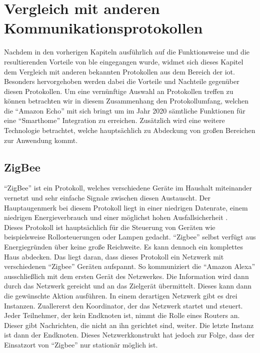 \section{Vergleich mit anderen Kommunikationsprotokollen}
\label{s:vergleich}

Nachdem in den vorherigen Kapiteln ausführlich auf die Funktionsweise und die resultierenden Vorteile von \ac{ble} eingegangen wurde, widmet sich dieses Kapitel dem Vergleich mit anderen bekannten Protokollen aus dem Bereich der \ac{iot}. Besonders hervorgehoben werden dabei die Vorteile und Nachteile gegenüber diesen Protokollen. Um eine vernünftige Auswahl an Protokollen treffen zu können betrachten wir in diesem Zusammenhang den Protokollumfang, welchen die "`Amazon Echo"' mit sich bringt um im Jahr 2020 sämtliche Funktionen für eine "`Smarthome"' Integration zu erreichen. Zusätzlich wird eine weitere Technologie betrachtet, welche hauptsächlich zu Abdeckung von großen Bereichen zur Anwendung kommt.\\  

\subsection{ZigBee}
\label{ss:vergleich:zigbee}

"`ZigBee"' ist ein Protokoll, welches verschiedene Geräte im Haushalt miteinander vernetzt und sehr einfache Signale zwischen diesen Austauscht. Der Hauptaugenmerk bei diesem Protokoll liegt in einer niedrigen Datenrate, einem niedrigen Energieverbrauch und einer möglichst hohen Ausfallsicherheit \cite[Seite 195]{Gessler14:WNN}.\\ 

\noindent Dieses Protokoll ist hauptsächlich für die Steuerung von Geräten wie beispielsweise Rollosteuerungen oder Lampen gedacht. "`Zigbee"' selbst verfügt aus Energiegründen über keine große Reichweite. Es kann dennoch ein komplettes Haus abdecken. Das liegt daran, dass dieses Protokoll ein Netzwerk mit verschiedenen "`Zigbee"' Geräten aufspannt. So kommuniziert die "`Amazon Alexa"' ausschließlich mit dem ersten Gerät des Netzwerkes. Die Information wird dann durch das Netzwerk gereicht und an das Zielgerät übermittelt. Dieses kann dann die gewünschte Aktion ausführen. In einem derartigen Netzwerk gibt es drei Instanzen. Zuallererst den Koordinator, der das Netzwerk startet und steuert. Jeder Teilnehmer, der kein Endknoten ist, nimmt die Rolle eines Routers an. Dieser gibt Nachrichten, die nicht an ihn gerichtet sind, weiter. Die letzte Instanz ist dann der Endknoten. Dieses Netzwerkkonstrukt hat jedoch zur Folge, dass der Einsatzort von "`Zigbee"' nur stationär möglich ist.\\

